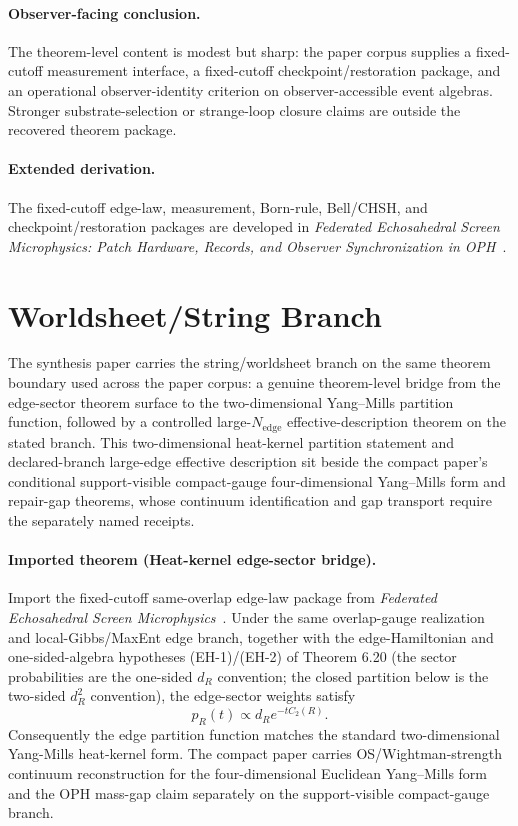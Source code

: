\paragraph{Observer-facing conclusion.}
The theorem-level content is modest but sharp: the paper corpus supplies a fixed-cutoff measurement interface,
a fixed-cutoff checkpoint/restoration package, and an operational observer-identity criterion on
observer-accessible event algebras. Stronger substrate-selection or strange-loop closure claims
are outside the recovered theorem package.

\paragraph{Extended derivation.}
The fixed-cutoff edge-law, measurement, Born-rule, Bell/CHSH, and checkpoint/restoration packages are developed in
\emph{Federated Echosahedral Screen Microphysics: Patch Hardware, Records, and Observer Synchronization in OPH}~\cite{ophmicrophysics}.

\section{Worldsheet/String Branch}

The synthesis paper carries the string/worldsheet branch on the same theorem boundary used across
the paper corpus: a genuine theorem-level bridge from the edge-sector theorem surface to
the two-dimensional Yang--Mills partition function, followed by a controlled large-\(N_{\mathrm{edge}}\)
effective-description theorem on the stated branch. This two-dimensional heat-kernel partition
statement and declared-branch large-edge effective description sit beside the compact paper's
conditional support-visible compact-gauge four-dimensional Yang--Mills form and repair-gap
theorems, whose continuum identification and gap transport require the separately named receipts.

\paragraph{Imported theorem (Heat-kernel edge-sector bridge).}
Import the fixed-cutoff same-overlap edge-law package from
\emph{Federated Echosahedral Screen Microphysics}~\cite{ophmicrophysics}.
Under the same overlap-gauge realization and local-Gibbs/MaxEnt edge branch, together with the
edge-Hamiltonian and one-sided-algebra hypotheses (EH-1)/(EH-2) of Theorem 6.20 (the sector
probabilities are the one-sided \(d_R\) convention; the closed partition below is the two-sided
\(d_R^2\) convention), the edge-sector weights satisfy
\[
p_R(t)\propto d_R e^{-t C_2(R)}.
\]
Consequently the edge partition function matches the standard two-dimensional Yang-Mills
heat-kernel form. The compact paper carries OS/Wightman-strength continuum reconstruction for the
four-dimensional Euclidean Yang--Mills form and the OPH mass-gap claim separately on the
support-visible compact-gauge branch.

